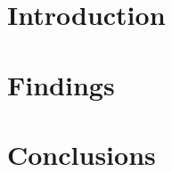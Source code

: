 

\usepackage{times} %

\title{}
\author{}
\date{}



\maketitle

\begin{abstract}
\end{abstract}

\section{Introduction}
\section{Findings}
\section{Conclusions}

   
